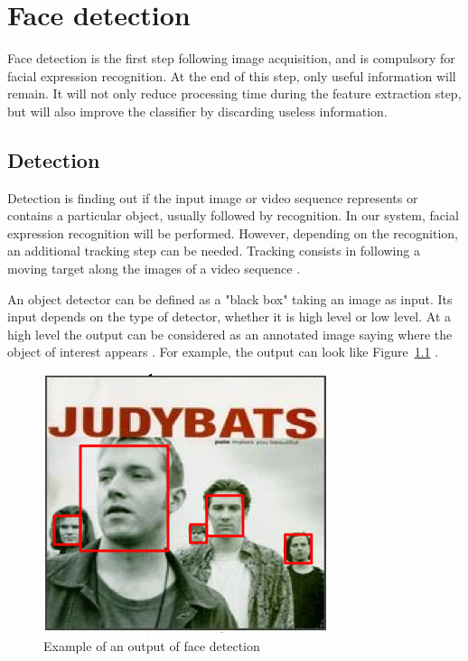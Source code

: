\chapter{Face detection}

\noindent Face detection is the first step following image acquisition, and is compulsory for facial expression recognition. At the end of this step, only useful information will remain. It will not only reduce processing time during the feature extraction step, but will also improve the classifier by discarding useless information.
\newline

\section{Detection}

\vspace{\baselineskip}
\noindent Detection is finding out if the input image or video sequence represents or contains a particular object, usually followed by recognition. In our system, facial expression recognition will be performed. However, depending on the recognition, an additional tracking step can be needed. Tracking consists in following a moving target along the images of a video sequence \cite{DIN08}.
\newline

\noindent An object detector can be defined as a "black box" taking an image as input. Its input depends on the type of detector, whether it is high level or low level. At a high level the output can be considered as an annotated image saying where the object of interest appears \cite{DIN08}. For example, the output can look like Figure~\ref{output_example_face_detection} \cite{DIN08}.
\newline

\begin{figure}[!h]
\begin{center}
\noindent \includegraphics[scale=0.7]{figures/output_example_face_detection} 
\newline
\caption{Example of an output of face detection \cite{DIN08}}
\label{output_example_face_detection}
\end{center} 
\end{figure}

